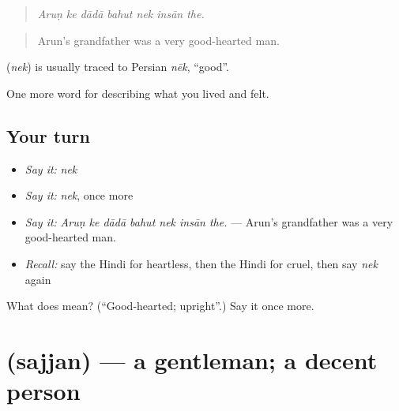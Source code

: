 \begin{quote}
      
\end{quote}

\begin{quote}
\emph{Aruṇ ke dādā bahut nek insān the.}
\end{quote}

\begin{quote}
Arun's grandfather was a very good-hearted man.
\end{quote}

\begin{cousinweb}
\textbf{} (\emph{nek}) is usually traced to Persian \emph{nēk}, \textquotedblleft{}good\textquotedblright{}.
\end{cousinweb}

\begin{grammarlens}[title={What you've built}]
One more word for describing what you lived and felt.
\end{grammarlens}

\subsection*{Your turn}
\begin{itemize}
\raggedright
  \item \emph{Say it:} \emph{nek}
  \item \emph{Say it:} \emph{nek}, once more
  \item \emph{Say it:} \emph{Aruṇ ke dādā bahut nek insān the.} — Arun's grandfather was a very good-hearted man.
  \item \emph{Recall:} say the Hindi for heartless, then the Hindi for cruel, then say \emph{nek} again
\end{itemize}

\begin{tcolorbox}[breakable,colback=teal!4,colframe=teal!35!black,title={Before you move on}]
What does  mean? (\textquotedblleft{}Good-hearted; upright\textquotedblright{}.) Say it once more.
\end{tcolorbox}
\section[\texorpdfstring{\hi{सज्जन} (sajjan)}{सज्जन (sajjan)}]{ (sajjan) — a gentleman; a decent person}

\label{lesson:HI-C466-sajjan}



